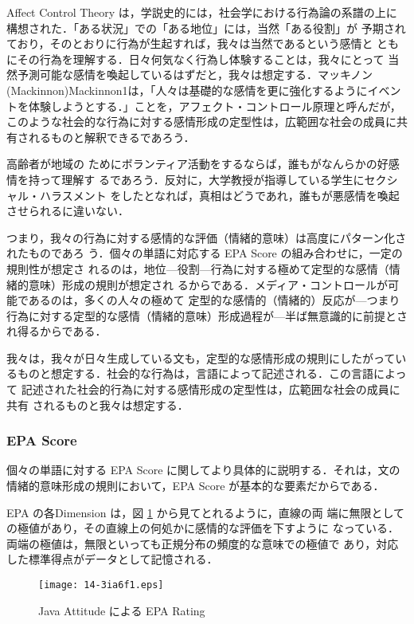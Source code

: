 \documentclass[japanese]{jnlp_1.3d}
\newcommand{\citep}{}
\begin{document}
Affect Control Theory は，学説史的には，社会学における行為論の系譜の上に
構想された．「ある状況」での「ある地位」には，当然「ある役割」が
予期されており，そのとおりに行為が生起すれば，我々は当然であるという感情と
ともにその行為を理解する．日々何気なく行為し体験することは，我々にとって
当然予測可能な感情を喚起しているはずだと，我々は想定する．マッキノン
(Mackinnon)\citep{Mackinnon1}は，「人々は基礎的な感情を更に強化するようにイベントを体験しようとする．」ことを，アフェクト・コントロール原理と呼んだが，このような社会的な行為に対する感情形成の定型性は，広範囲な社会の成員に共有されるものと解釈できるであろう．

高齢者が地域の
ためにボランティア活動をするならば，誰もがなんらかの好感情を持って理解す
るであろう．反対に，大学教授が指導している学生にセクシャル・ハラスメント
をしたとなれば，真相はどうであれ，誰もが悪感情を喚起させられるに違いない．


つまり，我々の行為に対する感情的な評価（情緒的意味）は高度にパターン化されたものであろ
う．個々の単語に対応する EPA Score の組み合わせに，一定の規則性が想定さ
れるのは，地位—役割—行為に対する極めて定型的な感情（情緒的意味）形成の規則が想定され
るからである．メディア・コントロールが可能であるのは，多くの人々の極めて
定型的な感情的（情緒的）反応が—つまり行為に対する定型的な感情（情緒的意味）形成過程が—半ば無意識的に前提とされ得るからである．



我々は，我々が日々生成している文も，定型的な感情形成の規則にしたがってい
るものと想定する．社会的な行為は，言語によって記述される．この言語によって
記述された社会的行為に対する感情形成の定型性は，広範囲な社会の成員に共有
されるものと我々は想定する．



\subsubsection{EPA Score} \label{key:EPA_Score}
個々の単語に対する EPA Score に関してより具体的に説明する．それは，文の
情緒的意味形成の規則において，EPA Score が基本的な要素だからである．

EPA の各Dimension は，図 \ref{key:fig1}  から見てとれるように，直線の両
端に無限としての極値があり，その直線上の何処かに感情的な評価を下すように
なっている．両端の極値は，無限といっても正規分布の頻度的な意味での極値で
あり，対応した標準得点がデータとして記憶される．

\begin{figure}[h] 
 \begin{center}
      \texttt{[image: 14-3ia6f1.eps]}
\caption{Java Attitude による EPA Rating} \label{key:fig1}
\end{center}
\vspace{-1\baselineskip}
\end{figure}
\end{document}
